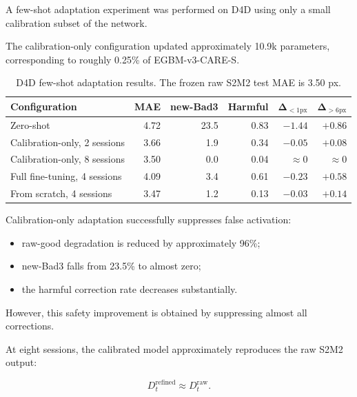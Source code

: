 \documentclass[11pt,a4paper]{article}
\begin{document}
A few-shot adaptation experiment was performed on D4D using only a small calibration
subset of the network.

The calibration-only configuration updated approximately 10.9k parameters,
corresponding to roughly 0.25\% of EGBM-v3-CARE-S.

\begin{table}[h]
\centering
\caption{D4D few-shot adaptation results. The frozen raw S2M2 test MAE is 3.50 px.}
\small
\begin{tabular}{lrrrrr}
\toprule
\textbf{Configuration}
& \textbf{MAE}
& \textbf{new-Bad3}
& \textbf{Harmful}
& $\boldsymbol{\Delta}_{<1\mathrm{px}}$
& $\boldsymbol{\Delta}_{>6\mathrm{px}}$ \\
\midrule
Zero-shot
& 4.72
& 23.5
& 0.83
& $-1.44$
& $+0.86$ \\

Calibration-only, 2 sessions
& 3.66
& 1.9
& 0.34
& $-0.05$
& $+0.08$ \\

Calibration-only, 8 sessions
& 3.50
& 0.0
& 0.04
& $\approx 0$
& $\approx 0$ \\

Full fine-tuning, 4 sessions
& 4.09
& 3.4
& 0.61
& $-0.23$
& $+0.58$ \\

From scratch, 4 sessions
& 3.47
& 1.2
& 0.13
& $-0.03$
& $+0.14$ \\
\bottomrule
\end{tabular}
\end{table}

Calibration-only adaptation successfully suppresses false activation:

\begin{itemize}[leftmargin=*]
    \item raw-good degradation is reduced by approximately 96\%;
    \item new-Bad3 falls from 23.5\% to almost zero;
    \item the harmful correction rate decreases substantially.
\end{itemize}

However, this safety improvement is obtained by suppressing almost all corrections.

At eight sessions, the calibrated model approximately reproduces the raw S2M2
output:

\begin{equation}
D_t^{\mathrm{refined}}
\approx
D_t^{\mathrm{raw}}.
\end{equation}
\end{document}
